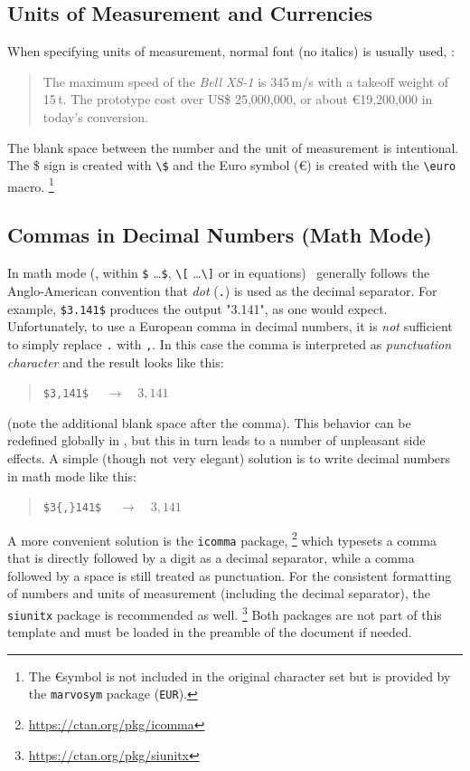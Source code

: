 \subsection{Units of Measurement and Currencies}

When specifying units of measurement, normal font (no italics) is usually
used, \eg:
%
\begin{quote}
	The maximum speed of the \textit{Bell XS-1} is 345\,m/s with a takeoff weight 
	of 15\,t. The prototype cost over US\$ 25,000,000, or about \euro 19,200,000
	in today's conversion.
\end{quote}
%
The blank space between the number and the unit of measurement is intentional.
The \$ sign is created with \verb!\$! and the Euro symbol (\euro) is created
with the \verb!\euro! macro.%
\footnote{The \euro symbol is not included in the original \latex character 
set but is provided by the \texttt{marvosym} package (\texttt{{\bs}EUR}).}


\subsection{Commas in Decimal Numbers (Math Mode)}


In math mode (\ie, within \verb!$! \ldots \verb!$!, \verb!\[! \ldots \verb!\]! or 
in equations) \latex\ generally follows the Anglo-American convention that 
\emph{dot} (\verb!.!) is used as the decimal separator.
For example, \verb!$3.141$! produces the output "3.141", as one would expect.
Unfortunately, to use a European comma in decimal numbers, it is \emph{not}
sufficient to simply replace \verb!.! with \verb!,!.
In this case the comma is interpreted as \emph{punctuation character} and 
the result looks like this:
%
\begin{quote}
	\verb!$3,141$! $\quad \rightarrow \quad 3,141$
\end{quote}
%
(note the additional blank space after the comma). This behavior can be
redefined globally in \latex, but this in turn leads to a number of unpleasant
side effects. A simple (though not very elegant) solution is to write decimal
numbers in math mode like this:
%
\begin{quote}
	\verb!$3{,}141$! $\quad \rightarrow \quad 3{,}141$
\end{quote}
%
A more convenient solution is the \texttt{icomma} package,%
\footnote{\url{https://ctan.org/pkg/icomma}}
which typesets a comma that is directly followed by a digit as a decimal
separator, while a comma followed by a space is still treated as punctuation.
For the consistent formatting of numbers and units of measurement (including
the decimal separator), the \texttt{siunitx} package is recommended as well.%
\footnote{\url{https://ctan.org/pkg/siunitx}}
Both packages are not part of this template and must be loaded in the preamble
of the document if needed.


